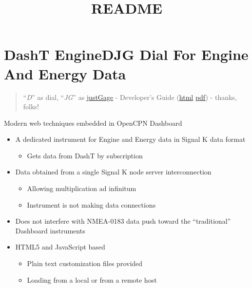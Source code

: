 \documentclass[11pt]{article}
\title{README}
\providecommand{\tightlist}{%
      \setlength{\itemsep}{0pt}\setlength{\parskip}{0pt}}
\begin{document}
    
    \maketitle
    
    

    
    \hypertarget{dasht-enginedjg-dial-for-engine-and-energy-data}{%
\section{DashT EngineDJG Dial For Engine And Energy
Data}\label{dasht-enginedjg-dial-for-engine-and-energy-data}}

    \begin{quote}
``\emph{D}'' as dial, ``\emph{JG}'' as
\href{https://github.com/toorshia/justgage}{justGage} - Developer's
Guide (\href{./developers/README.html}{html} \textbar{}
\href{./developers/README.pdf}{pdf}) - thanks, folks!
\end{quote}

    Modern web techniques embedded in OpenCPN Dashboard

\begin{itemize}
\tightlist
\item
  A dedicated instrument for Engine and Energy data in Signal K data
  format

  \begin{itemize}
  \tightlist
  \item
    Gets data from DashT by subscription
  \end{itemize}
\item
  Data obtained from a single Signal K node server interconnection

  \begin{itemize}
  \tightlist
  \item
    Allowing multiplication ad infinitum
  \item
    Instrument is not making data connections
  \end{itemize}
\item
  Does not interfere with NMEA-0183 data push toward the ``traditional''
  Dashboard instruments
\item
  HTML5 and JavaScript based

  \begin{itemize}
  \tightlist
  \item
    Plain text customization files provided
  \item
    Loading from a local or from a remote host
  \end{itemize}
\end{itemize}
\end{document}
